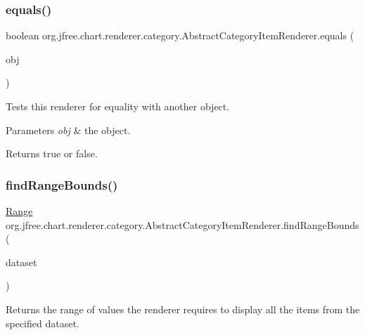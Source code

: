 \subsubsection{\texorpdfstring{equals()}{equals()}}
{\footnotesize\ttfamily boolean org.\+jfree.\+chart.\+renderer.\+category.\+Abstract\+Category\+Item\+Renderer.\+equals (\begin{DoxyParamCaption}\item[{Object}]{obj }\end{DoxyParamCaption})}

Tests this renderer for equality with another object.


\begin{DoxyParams}{Parameters}
{\em obj} & the object.\\
\hline
\end{DoxyParams}
\begin{DoxyReturn}{Returns}
{\ttfamily true} or {\ttfamily false}. 
\end{DoxyReturn}
\mbox{\label{classorg_1_1jfree_1_1chart_1_1renderer_1_1category_1_1_abstract_category_item_renderer_aba6ace35854f96515fecf819b4fa20f7}} 
\subsubsection{\texorpdfstring{find\+Range\+Bounds()}{findRangeBounds()}\hspace{0.1cm}{\footnotesize\ttfamily [1/2]}}
{\footnotesize\ttfamily \mbox{\hyperlink{classorg_1_1jfree_1_1data_1_1_range}{Range}} org.\+jfree.\+chart.\+renderer.\+category.\+Abstract\+Category\+Item\+Renderer.\+find\+Range\+Bounds (\begin{DoxyParamCaption}\item[{\mbox{\hyperlink{interfaceorg_1_1jfree_1_1data_1_1category_1_1_category_dataset}{Category\+Dataset}}}]{dataset }\end{DoxyParamCaption})}

Returns the range of values the renderer requires to display all the items from the specified dataset.


